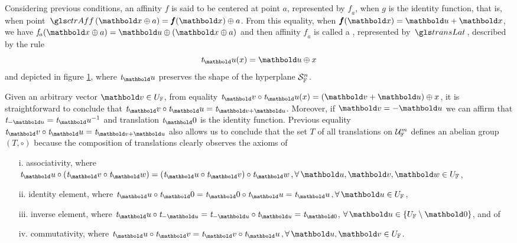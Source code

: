 Considering previous conditions, an affinity $\mathit{f}$ is said to be centered at point $a$, represented by $\mathit{f}_a$, when $\mathit{g}$ is the identity function, that is, when point $\fua{\gloref{ctrAff}}{\vto{x}\oplus a}=\fua{\vtf{f}}{\vto{x}}\oplus a$. From this equality, when $\fua{\vtf{f}}{\vto{x}}=\vto{u}+\vto{x}$, we have $\fua{\mathit{f}_a}{\vto{x}\oplus a}=\vto{u}\oplus(\vto{x}\oplus a)$ and then affinity $\mathit{f}_a$ is called a , represented by $\gloref{transLat}$, described by the rule
\begin{equation}\label{eq:translt}
\fua{\mathit{t}_\vto{u}}{x}=\vto{u}\oplus x
\end{equation}
and depicted in figure \ref{fg:translat}, where $\mathit{t}_\vto{u}$ preserves the shape of the hyperplane $\eamd{S}{F}{n}$.
\begin{figure}[!ht]
\centering
\begin{center}
\scalebox{.72}{}
\end{center}
\label{fg:translat}
\end{figure}
Given an arbitrary vector $\vto{v}\in U_\cam{F}$, from equality $\fua{\mathit{t}_\vto{v}\circ\mathit{t}_\vto{u}}{x}=(\vto{v}+\vto{u})\oplus x$,
it is straightforward to conclude that $\mathit{t}_\vto{v}\circ\mathit{t}_\vto{u}=\mathit{t}_{\vto{v}+\vto{u}}$. Moreover, if $\vto{v}=-\vto{u}$ we can affirm that $\mathit{t}_{-\vto{u}}=\mathit{t}_\vto{u}^{-1}$ and translation $\mathit{t}_\vto{0}$ is the identity function. Previous equality $\mathit{t}_\vto{v}\circ\mathit{t}_\vto{u}=\mathit{t}_{\vto{v}+\vto{u}}$ also allows us to conclude that the set $\mathit{T}$ of all translations on $\eamd{U}{F}{m}$ defines an abelian group $(\mathit{T},\circ)$ because the composition of translations clearly observes the axioms of
\begin{itemize}
\setlength\itemsep{.1em}
\item[i.] associativity, where $\mathit{t}_\vto{u}\circ\lpa \mathit{t}_\vto{v} \circ \mathit{t}_\vto{w} \rpa =
\lpa\mathit{t}_\vto{u}\circ \mathit{t}_\vto{v} \rpa\circ \mathit{t}_\vto{w} \, , \forall \, \vto{u},\vto{v},\vto{w}\in U_\cam{F}$,
\item[ii.] identity element, where $\mathit{t}_\vto{u}\circ\mathit{t}_\vto{0}=\mathit{t}_\vto{0}\circ\mathit{t}_\vto{u}=\mathit{t}_\vto{u}\,,\forall \, \vto{u} \in U_\cam{F}$,
\item[iii.] inverse element, where
$\mathit{t}_\vto{u} \circ  \mathit{t}_{-\vto{u}}= \mathit{t}_{-\vto{u}} \circ \mathit{t}_{\vto{u}} = \mathit{t}_{\vto{0}}$, $\forall \, \vto{u} \in \{U_\cam{F}\setminus\vto{0}\}$, and of
\item[iv.] commutativity, where $\mathit{t}_\vto{u}\circ \mathit{t}_\vto{v}= \mathit{t}_\vto{v}\circ \mathit{t}_\vto{u}\,,\forall \, \vto{u},\vto{v} \in U_\cam{F}$.
\end{itemize}


